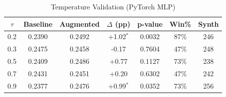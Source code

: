 \begin{table}[htbp]
\centering
\caption{Temperature Validation (PyTorch MLP)}
\label{tab:pytorch_temperature}
\begin{tabular}{ccccccc}
\toprule
$\tau$ & Baseline & Augmented & $\Delta$ (pp) & p-value & Win\% & Synth \\
\midrule
0.2 & 0.2390 & 0.2492 & +1.02$^{*}$ & 0.0032 & 87\% & 246 \\
0.3 & 0.2475 & 0.2458 & -0.17 & 0.7604 & 47\% & 248 \\
0.5 & 0.2409 & 0.2486 & +0.77 & 0.1127 & 73\% & 238 \\
0.7 & 0.2431 & 0.2451 & +0.20 & 0.6302 & 47\% & 242 \\
0.9 & 0.2377 & 0.2476 & +0.99$^{*}$ & 0.0352 & 73\% & 256 \\
\bottomrule
\end{tabular}
\end{table}